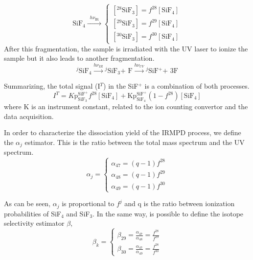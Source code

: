 \documentclass[global,twocolumn]{svjour}
\begin{document}
\begin{equation}
\text{SiF$_{4}$} \xrightarrow{\,\,\, h\nu_{\text{IR}} \,\,\,}
\begin{cases}
[^{28}\text{SiF$_{3}$}] = f^{28}[\text{SiF$_{4}$} ] \\
[^{29}\text{SiF$_{3}$}] = f^{29}[\text{SiF$_{4}$} ] \\
[^{30}\text{SiF$_{3}$}] = f^{30}[\text{SiF$_{4}$} ]
\end{cases}
\end{equation}
After this fragmentation, the sample is irradiated with the UV laser to ionize the sample but it also leads to another fragmentation.
\begin{equation}
\text{$^{j}$SiF$_{4}$} \xrightarrow{h \nu_{IR}} \text{$^{j}$SiF$_{3}$+ F} \xrightarrow{h \nu_{UV}} \text{$^{j}$SiF$^{+}$+ 3F}
\end{equation}

Summarizing, the total signal (I$^{T}$) in the SiF$^{+}$ is a combination of both processes.
\begin{equation}
I^{T} = K \text{p}_{\text{SiF$_{3}$}}^{\text{SiF$^{+}$}} f^{28}[\text{SiF$_{4}$}] + \text{K} \text{p}_{\text{SiF$_{4}$}}^{\text{SiF$^{+}$}} (1-f^{28})[\text{SiF$_{4}$}]
\end{equation}
where K is an instrument constant, related to the ion counting convertor and the data acquisition.

In order to characterize the dissociation yield of the IRMPD process, we define the $\alpha_{j}$ estimator. This is the ratio between the total mass spectrum and the UV spectrum.
\begin{equation}
\alpha_{j} =
\begin{cases}
\alpha_{47} = (q-1)f^{28} \\
\alpha_{48} = (q-1)f^{29} \\
\alpha_{49} = (q-1)f^{30}
\end{cases}
\end{equation}

As can be seen, $\alpha_{j}$ is proportional to $f^{j}$ and q is the ratio between ionization probabilities of SiF$_{4}$ and SiF$_{3}$. In the same way, is possible to define the isotope selectivity estimator $\beta$,
\begin{equation}
\beta_{k} =
\begin{cases}
\beta_{29} = \frac{\alpha_{47}}{\alpha_{48}} = \frac{f^{28}}{f^{29}} \\
\beta_{30} = \frac{\alpha_{47}}{\alpha_{49}} = \frac{f^{28}}{f^{30}}
\end{cases}
\end{equation}
\end{document}
